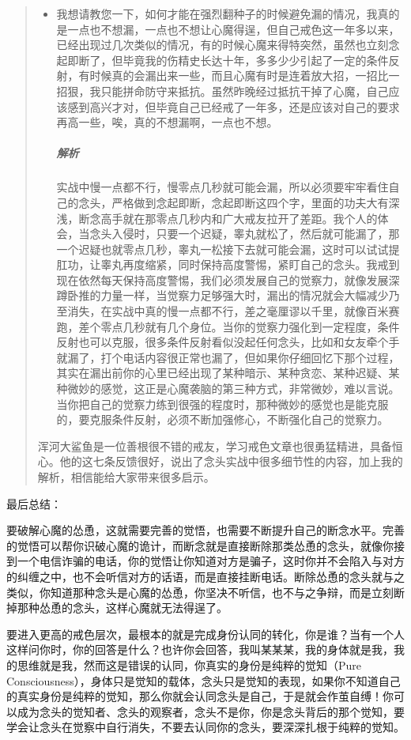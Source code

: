 \begin{quotation}
\begin{itemize}
        \item 我想请教您一下，如何才能在强烈翻种子的时候避免漏的情况，我真的是一点也不想漏，一点也不想让心魔得逞，但自己戒色这一年多以来，已经出现过几次类似的情况，有的时候心魔来得特突然，虽然也立刻念起即断了，但毕竟我的伤精史长达十年，多多少少引起了一定的条件反射，有时候真的会漏出来一些，而且心魔有时是连着放大招，一招比一招狠，我只能拼命防守来抵抗。虽然昨晚经过抵抗干掉了心魔，自己应该感到高兴才对，但毕竟自己已经戒了一年多，还是应该对自己的要求再高一些，唉，真的不想漏啊，一点也不想。\subparagraph{解析}实战中慢一点都不行，慢零点几秒就可能会漏，所以必须要牢牢看住自己的念头，严格做到念起即断，念起即断这四个字，里面的功夫大有深浅，断念高手就在那零点几秒内和广大戒友拉开了差距。我个人的体会，当念头入侵时，只要一个迟疑，睾丸就松了，然后就可能漏了，那一个迟疑也就零点几秒，睾丸一松接下去就可能会漏，这时可以试试提肛功，让睾丸再度缩紧，同时保持高度警惕，紧盯自己的念头。我戒到现在依然每天保持高度警惕，我们必须发展自己的觉察力，就像发展深蹲卧推的力量一样，当觉察力足够强大时，漏出的情况就会大幅减少乃至消失，在实战中真的慢一点都不行，差之毫厘谬以千里，就像百米赛跑，差个零点几秒就有几个身位。当你的觉察力强化到一定程度，条件反射也可以克服，很多条件反射看似没起任何念头，比如和女友牵个手就漏了，打个电话内容很正常也漏了，但如果你仔细回忆下那个过程，其实在漏出前你的心里已经出现了某种暗示、某种贪恋、某种迟疑、某种微妙的感觉，这正是心魔袭脑的第三种方式，非常微妙，难以言说。当你把自己的觉察力练到很强的程度时，那种微妙的感觉也是能克服的，要克服条件反射，必须不断加强修心，不断强化自己的觉察力。
    \end{itemize}

    浑河大鲨鱼是一位善根很不错的戒友，学习戒色文章也很勇猛精进，具备恒心。他的这七条反馈很好，说出了念头实战中很多细节性的内容，加上我的解析，相信能给大家带来很多启示。
\end{quotation}

最后总结：

要破解心魔的怂恿，这就需要完善的觉悟，也需要不断提升自己的断念水平。完善的觉悟可以帮你识破心魔的诡计，而断念就是直接断除那类怂恿的念头，就像你接到一个电信诈骗的电话，你的觉悟让你知道对方是骗子，这时你并不会陷入与对方的纠缠之中，也不会听信对方的话语，而是直接挂断电话。断除怂恿的念头就与之类似，你知道那种念头是心魔的怂恿，你坚决不听信，也不与之争辩，而是立刻断掉那种怂恿的念头，这样心魔就无法得逞了。

要进入更高的戒色层次，最根本的就是完成身份认同的转化，你是谁？当有一个人这样问你时，你的回答是什么？也许你会回答，我叫某某某，我的身体就是我，我的思维就是我，然而这是错误的认同，你真实的身份是纯粹的觉知（Pure Consciousness），身体只是觉知的载体，念头只是觉知的表现，如果你不知道自己的真实身份是纯粹的觉知，那么你就会认同念头是自己，于是就会作茧自缚！你可以成为念头的觉知者、念头的观察者，念头不是你，你是念头背后的那个觉知，要学会让念头在觉察中自行消失，不要去认同你的念头，要深深扎根于纯粹的觉知。

